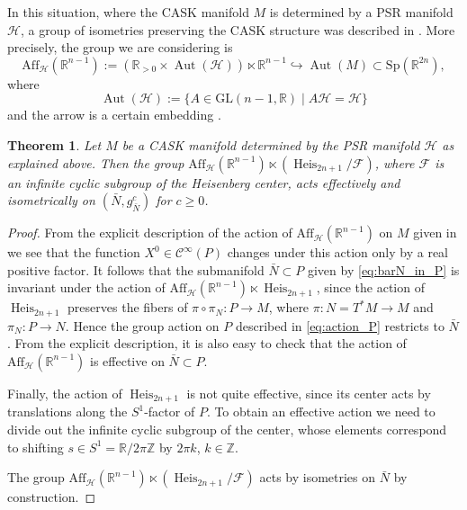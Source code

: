\documentclass{article}
\newtheorem{theorem}{Theorem}[section]
\theoremstyle{definition}
\DeclareMathOperator{\Aut}{Aut}
\DeclareMathOperator{\Heis}{Heis}
\newcommand{\Z}{\mathbb{Z}}
\newcommand{\R}{\mathbb{R}}
\newcommand{\calC}{\mathcal{C}}
\newcommand{\calF}{\mathcal{F}}
\newcommand{\calH}{\mathcal{H}}
\newcommand{\GL}{\mathrm{GL}}
\newcommand{\Sp}{\mathrm{Sp}}
\begin{document}
     In this situation, where the CASK manifold $M$ is determined by a PSR manifold $\calH$, a group of isometries preserving the CASK structure was described in \cite[Appendix~A]{CDJL21}. More precisely, the group we are considering is $$\mathrm{Aff}_{\calH}(\R^{n-1}):=(\R_{>0}\times\Aut(\calH))\ltimes\R^{n-1}\hookrightarrow\Aut(M)\subset\Sp(\R^{2n}),$$ where $$\Aut(\calH):=\{A\in\GL(n-1,\R)\mid A\calH=\calH\}$$ and the arrow is a certain embedding \cite[Proposition~23]{CDJL21}.
    
    \begin{theorem}\label{thm:effective_action}
        Let $M$ be a CASK manifold determined by the PSR manifold $\calH$ as explained above. Then the group $\mathrm{Aff}_{\calH}(\R^{n-1})\ltimes(\Heis_{2n+1}/\calF)$, where $\calF$ is an infinite cyclic subgroup of the Heisenberg center, acts effectively and isometrically on $(\bar N,g_{\bar N}^c)$ for $c\geq0$.
    \end{theorem}

    \begin{proof}
        From the explicit description of the action of $\mathrm{Aff}_{\calH}(\R^{n-1})$ on $M$ given in \cite[Appendix~A]{CDJL21} we see that the function $X^0\in\calC^\infty(P)$ changes under this action only by a real positive factor. It follows that the submanifold $\bar N\subset P$ given by \eqref{eq:barN_in_P} is invariant under the action of $\mathrm{Aff}_{\calH}(\R^{n-1})\ltimes\Heis_{2n+1}$, since the action of $\Heis_{2n+1}$ preserves the fibers of $\pi\circ\pi_N:P\longrightarrow M$, where $\pi:N=T^*M\longrightarrow M$ and $\pi_N:P\longrightarrow N$. Hence the group action on $P$ described in \eqref{eq:action_P} restricts to $\bar N$. From the explicit description, it is also easy to check that the action of $\mathrm{Aff}_{\calH}(\R^{n-1})$ is effective on $\bar N\subset P$.\medskip
        
        Finally, the action of $\Heis_{2n+1}$ is not quite effective, since its center acts by translations along the $S^1$-factor of $P$. To obtain an effective action we need to divide out the infinite cyclic subgroup of the center, whose elements correspond to shifting $s\in S^1=\R/2\pi\Z$ by $2\pi k$, $k\in\Z$.\medskip

        The group $\mathrm{Aff}_{\calH}(\R^{n-1})\ltimes(\Heis_{2n+1}/\calF)$ acts by isometries on $\bar N$ by construction.
    \end{proof}
\end{document}
